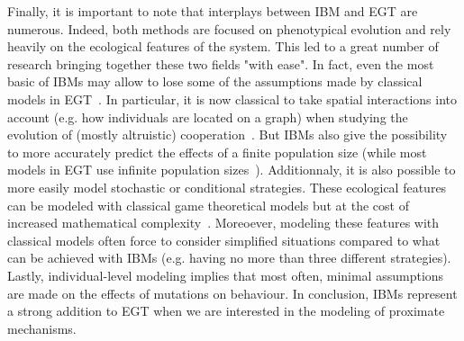     Finally, it is important to note that interplays between IBM and EGT are numerous. Indeed, both methods are focused on phenotypical evolution and rely heavily on the ecological features of the system. This led to a great number of research bringing together these two fields "with ease". In fact, even the most basic of IBMs may allow to lose some of the assumptions made by  classical models in EGT~\parencite{Adami2014}. In particular, it is now classical to take spatial interactions into account (e.g. how individuals are located on a graph) when studying the evolution of (mostly altruistic) cooperation~\parencite{Hauert2004}. But IBMs also give the possibility to more accurately predict the effects of a finite population size (while most models in EGT use infinite population sizes~\parencite{Hauert2009}). Additionnaly, it is also possible to more easily model stochastic or conditional strategies. These ecological features can be modeled with classical game theoretical models but at the cost of increased mathematical complexity~\parencite{Hauert2009}. Moreoever, modeling these features with classical models often force to consider simplified situations compared to what can be achieved with IBMs (e.g. having no more than three different strategies). Lastly, individual-level modeling implies that most often, minimal assumptions are made on the effects of mutations on behaviour. In conclusion, IBMs represent a strong addition to EGT when we are interested in the modeling of proximate mechanisms.



